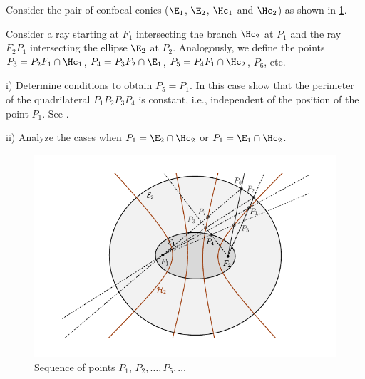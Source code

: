


\begin{exercise}
\label{exerc:08-02-periodicsequence}
Consider the pair of confocal conics ($\E_1$, $\E_2$, $\Hc_1$ and $\Hc_2$) as shown in  \cref{fig:retangulo_exerc82}.

  Consider a ray starting at $F_1$ intersecting the branch $\Hc_2$ at $P_1$ and  the ray
  $F_2P_1$  intersecting the ellipse $\E_2$  at $P_2$. Analogously, we define the points $P_3=P_2F_1\cap\Hc_1$, $P_4=P_3F_2\cap\E_1$, $P_5=P_4F_1\cap\Hc_2$,
  $P_6$, etc.  
  
\noindent i) Determine conditions to obtain $P_5=P_1$. 
In this case show that the perimeter of the quadrilateral
$P_1P_2P_3P_4$ is constant, i.e., independent of the position of the point $P_1$.  See \cite{dolgirev2014}.


\noindent ii) Analyze the cases when $P_1=\E_2\cap \Hc_2$ or $P_1=\E_1\cap \Hc_2$.

 \begin{figure}[H]
 	\begin{center}
 	 \includegraphics[scale=1]{chap_09/pics/pics_09_910_dinamica_retangulos.pdf}
 		\caption {Sequence of points $P_1,  \,P_2, \ldots,  P_5 ,  \ldots$  
 		 \label{fig:retangulo_exerc82} }
 	\end{center}
 	\end{figure}
 	
 	\end{exercise}